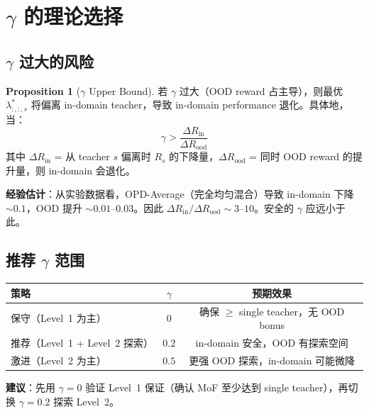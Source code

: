 \documentclass[11pt,a4paper]{article}
\theoremstyle{definition}
\newtheorem{proposition}{Proposition}
\begin{document}
\section{$\gamma$ 的理论选择}
\label{sec:gamma_theory}

\subsection{$\gamma$ 过大的风险}

\begin{proposition}[$\gamma$ Upper Bound]
\label{prop:gamma_upper}
若 $\gamma$ 过大（OOD reward 占主导），则最优 $\lambda^*_{:,:,s}$ 将偏离 in-domain teacher，导致 in-domain performance 退化。具体地，当：
\begin{equation}
\gamma > \frac{\Delta R_{\mathrm{in}}}{\Delta R_{\mathrm{ood}}}
\end{equation}
其中 $\Delta R_{\mathrm{in}}$ = 从 teacher $s$ 偏离时 $R_s$ 的下降量，$\Delta R_{\mathrm{ood}}$ = 同时 OOD reward 的提升量，则 in-domain 会退化。

\textbf{经验估计}：从实验数据看，OPD-Average（完全均匀混合）导致 in-domain 下降 $\sim 0.1$，OOD 提升 $\sim 0.01$--$0.03$。因此 $\Delta R_{\mathrm{in}}/\Delta R_{\mathrm{ood}} \sim 3$--$10$。安全的 $\gamma$ 应远小于此。
\end{proposition}

\subsection{推荐 $\gamma$ 范围}

\begin{tcolorbox}[colback=blue!5, colframe=blue!40, title=推荐配置]
\begin{center}
\begin{tabular}{lcc}
\toprule
\textbf{策略} & $\gamma$ & \textbf{预期效果} \\
\midrule
保守（Level~1 为主） & $0$ & 确保 $\geq$ single teacher，无 OOD bonus \\
推荐（Level~1 + Level~2 探索） & $0.2$ & in-domain 安全，OOD 有探索空间 \\
激进（Level~2 为主） & $0.5$ & 更强 OOD 探索，in-domain 可能微降 \\
\bottomrule
\end{tabular}
\end{center}

\textbf{建议}：先用 $\gamma = 0$ 验证 Level~1 保证（确认 MoF 至少达到 single teacher），再切换 $\gamma = 0.2$ 探索 Level~2。
\end{tcolorbox}
\end{document}
